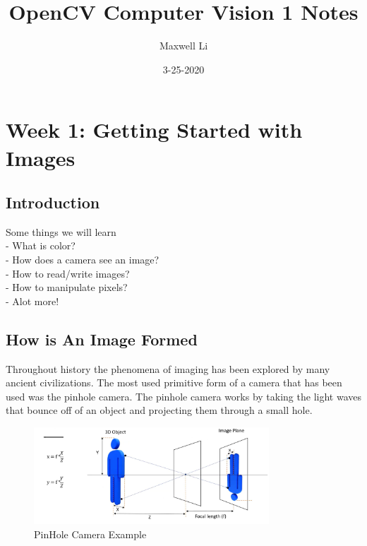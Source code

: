 \documentclass[fleqn]{article}
\title{OpenCV Computer Vision 1 Notes}
\date{3-25-2020}
\author{Maxwell Li}
\begin{document}
  \makeatletter %
  \patchcmd{\ps@plain}{\thepage}{\textcolor{black!20!white}{\thepage}}{}{}

  \color{black!20!white}
  \pagecolor{black!80!white}

  \maketitle
  \tableofcontents
  \setcounter{secnumdepth}{0}
  \newpage

  \section{\textbf{Week 1: Getting Started with Images}}
    \subsection{Introduction}
    Some things we will learn\\
    \quad - What is color?\\
    \quad - How does a camera see an image?\\
    \quad - How to read/write images?\\
    \quad - How to manipulate pixels?\\
    \quad - Alot more!

    \subsection{How is An Image Formed}
    Throughout history the phenomena of imaging has been explored by many ancient civilizations. The most used primitive form of a camera that has been used was the pinhole camera. The pinhole camera works by taking the light waves that bounce off of an object and projecting them through a small hole.

    \begin{figure}[h]
      \centering
      \includegraphics[width = 250pt]{pinholecamera.png}
      \caption{PinHole Camera Example}
      \label{fig: Pinhole Camera}
    \end{figure}
\end{document}
